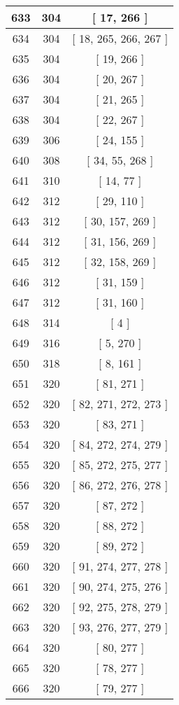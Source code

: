 \begin{center}
\begin{longtable}[H]{|| c c c ||}
\hline
633 & 304 & [ 17, 266 ] \\ 
\hline
634 & 304 & [ 18, 265, 266, 267 ] \\ 
\hline
635 & 304 & [ 19, 266 ] \\ 
\hline
636 & 304 & [ 20, 267 ] \\ 
\hline
637 & 304 & [ 21, 265 ] \\ 
\hline
638 & 304 & [ 22, 267 ] \\ 
\hline
639 & 306 & [ 24, 155 ] \\ 
\hline
640 & 308 & [ 34, 55, 268 ] \\ 
\hline
641 & 310 & [ 14, 77 ] \\ 
\hline
642 & 312 & [ 29, 110 ] \\ 
\hline
643 & 312 & [ 30, 157, 269 ] \\ 
\hline
644 & 312 & [ 31, 156, 269 ] \\ 
\hline
645 & 312 & [ 32, 158, 269 ] \\ 
\hline
646 & 312 & [ 31, 159 ] \\ 
\hline
647 & 312 & [ 31, 160 ] \\ 
\hline
648 & 314 & [ 4 ] \\ 
\hline
649 & 316 & [ 5, 270 ] \\ 
\hline
650 & 318 & [ 8, 161 ] \\ 
\hline
651 & 320 & [ 81, 271 ] \\ 
\hline
652 & 320 & [ 82, 271, 272, 273 ] \\ 
\hline
653 & 320 & [ 83, 271 ] \\ 
\hline
654 & 320 & [ 84, 272, 274, 279 ] \\ 
\hline
655 & 320 & [ 85, 272, 275, 277 ] \\ 
\hline
656 & 320 & [ 86, 272, 276, 278 ] \\ 
\hline
657 & 320 & [ 87, 272 ] \\ 
\hline
658 & 320 & [ 88, 272 ] \\ 
\hline
659 & 320 & [ 89, 272 ] \\ 
\hline
660 & 320 & [ 91, 274, 277, 278 ] \\ 
\hline
661 & 320 & [ 90, 274, 275, 276 ] \\ 
\hline
662 & 320 & [ 92, 275, 278, 279 ] \\ 
\hline
663 & 320 & [ 93, 276, 277, 279 ] \\ 
\hline
664 & 320 & [ 80, 277 ] \\ 
\hline
665 & 320 & [ 78, 277 ] \\ 
\hline
666 & 320 & [ 79, 277 ] \\ 

\end{longtable}
\end{center}
